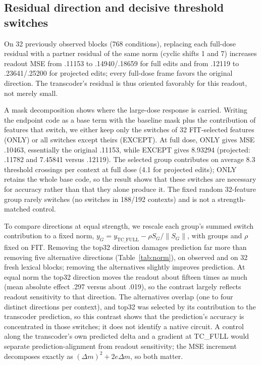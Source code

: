 \documentclass[11pt]{article}
\begin{document}
\subsection{Residual direction and decisive threshold switches}
On 32 previously observed blocks (768 conditions), replacing each full-dose residual with a partner residual of the same norm (cyclic shifts 1 and 7) increases readout MSE from .11153 to .14940/.18659 for full edits and from .12119 to .23641/.25200 for projected edits; every full-dose frame favors the original direction. The transcoder's residual is thus oriented favorably for this readout, not merely small.

A mask decomposition shows where the large-dose response is carried. Writing the endpoint code as a base term with the baseline mask plus the contribution of features that switch, we either keep only the switches of 32 FIT-selected features (ONLY) or all switches except theirs (EXCEPT). At full dose, ONLY gives MSE .10463, essentially the original .11153, while EXCEPT gives 8.93294 (projected: .11782 and 7.45841 versus .12119). The selected group contributes on average 8.3 threshold crossings per context at full dose (4.1 for projected edits); ONLY retains the whole base code, so the result shows that these switches are necessary for accuracy rather than that they alone produce it. The fixed random 32-feature group rarely switches (no switches in 188/192 contexts) and is not a strength-matched control.

To compare directions at equal strength, we rescale each group's summed switch contribution to a fixed norm, $y_G=y_{\mathrm{TC\_FULL}}-\rho S_G/\|S_G\|$, with groups and $\rho$ fixed on FIT. Removing the top32 direction damages prediction far more than removing five alternative directions (Table~\ref{tab:norm}), on observed and on 32 fresh lexical blocks; removing the alternatives slightly improves prediction. At equal norm the top32 direction moves the readout about fifteen times as much (mean absolute effect .297 versus about .019), so the contrast largely reflects readout sensitivity to that direction. The alternatives overlap (one to four distinct directions per context), and top32 was selected by its contribution to the transcoder prediction, so this contrast shows that the prediction's accuracy is concentrated in those switches; it does not identify a native circuit. A control along the transcoder's own predicted delta and a gradient at TC\_FULL would separate prediction-alignment from readout sensitivity; the MSE increment decomposes exactly as $(\Delta m)^2+2e\Delta m$, so both matter.
\end{document}
